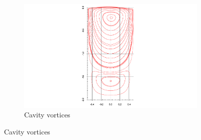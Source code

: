 \documentclass[twocolumn,10pt]{asme2ej}
\begin{document}
\clearpage
\begin{figure}[tbh]
        \centering
        \begin{subfigure}[b]{0.5\textwidth}
                \includegraphics[width=\textwidth]{figure/AR2-Re100 streamFunction axis final.pdf}
                \caption{Cavity vortices}
                \label{AR2RE100_cavity}
        \end{subfigure}%
        \label{AR2RE100}


\end{figure}
\end{document}

